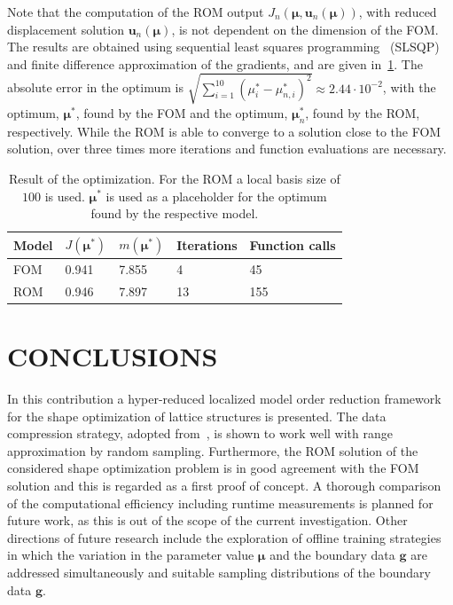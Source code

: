 \documentclass[a4paper]{eccomas_paper-2024}
\newcommand{\m}{\bm\mu}
\begin{document}
Note that the computation of the ROM output $J_n(\m, \bm{u}_n(\m))$, with reduced displacement solution $\bm{u}_n(\m)$, is not dependent on the dimension of the FOM.
The results are obtained using sequential least squares programming~\cite{kraft1988software} (SLSQP) and finite difference approximation of the gradients, and are given in~\cref{tab:opt_result}.
The absolute error in the optimum is $\sqrt{\sum_{i=1}^{10}(\mu_i^{\ast}-\mu_{n,i}^{\ast})^2} \approx 2.44\cdot 10^{-2}$, with the optimum, $\m^{\ast}$, found by the FOM and the optimum, $\m_n^{\ast}$, found by the ROM, respectively.
While the ROM is able to converge to a solution close to the FOM solution, over three times more iterations and function evaluations are necessary.

\begin{table}
    \caption{Result of the optimization. For the ROM a local basis size of $100$ is used. $\m^{\ast}$ is used as a placeholder for the optimum found by the respective model.}\label{tab:opt_result}
    \begin{center}
        \begin{tabularx}{\textwidth}{XXXXX}
            \toprule
            Model & $J(\m^{\ast})$ & $m(\m^{\ast})$ & Iterations & Function calls\\\midrule
            FOM   &  0.941         &  7.855  & 4          & 45\\
            ROM   &  0.946         &  7.897  & 13         & 155\\
            \bottomrule
        \end{tabularx}
    \end{center}
\end{table}


\section{CONCLUSIONS} %
\label{sec:conclusions}
In this contribution a hyper-reduced localized model order reduction framework for the shape optimization of lattice structures is presented.
The data compression strategy, adopted from~\cite{Taddei2018Localization}, is shown to work well with range approximation by random sampling.
Furthermore, the ROM solution of the considered shape optimization problem is in good agreement with the FOM solution and this is regarded as a first proof of concept.
A thorough comparison of the computational efficiency including runtime measurements is planned for future work, as this is out of the scope of the current investigation.
Other directions of future research include the exploration of offline training strategies in which the variation in the parameter value $\m$ and the boundary data $\bm{g}$ are addressed simultaneously and suitable sampling distributions of the boundary data $\bm{g}$.


\printbibliography[title=REFERENCES]
\end{document}
